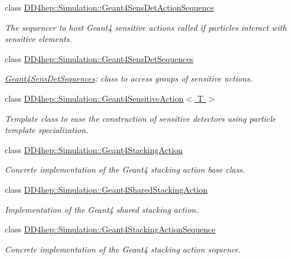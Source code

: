 \begin{DoxyCompactItemize}
class \hyperlink{class_d_d4hep_1_1_simulation_1_1_geant4_sens_det_action_sequence}{DD4hep::Simulation::Geant4SensDetActionSequence}
\begin{DoxyCompactList}\small\item\em The sequencer to host Geant4 sensitive actions called if particles interact with sensitive elements. \item\end{DoxyCompactList}\item 
class \hyperlink{class_d_d4hep_1_1_simulation_1_1_geant4_sens_det_sequences}{DD4hep::Simulation::Geant4SensDetSequences}
\begin{DoxyCompactList}\small\item\em \hyperlink{class_d_d4hep_1_1_simulation_1_1_geant4_sens_det_sequences}{Geant4SensDetSequences}: class to access groups of sensitive actions. \item\end{DoxyCompactList}\item 
class \hyperlink{class_d_d4hep_1_1_simulation_1_1_geant4_sensitive_action}{DD4hep::Simulation::Geant4SensitiveAction$<$ T $>$}
\begin{DoxyCompactList}\small\item\em Template class to ease the construction of sensitive detectors using particle template specialization. \item\end{DoxyCompactList}\item 
class \hyperlink{class_d_d4hep_1_1_simulation_1_1_geant4_stacking_action}{DD4hep::Simulation::Geant4StackingAction}
\begin{DoxyCompactList}\small\item\em Concrete implementation of the Geant4 stacking action base class. \item\end{DoxyCompactList}\item 
class \hyperlink{class_d_d4hep_1_1_simulation_1_1_geant4_shared_stacking_action}{DD4hep::Simulation::Geant4SharedStackingAction}
\begin{DoxyCompactList}\small\item\em Implementation of the Geant4 shared stacking action. \item\end{DoxyCompactList}\item 
class \hyperlink{class_d_d4hep_1_1_simulation_1_1_geant4_stacking_action_sequence}{DD4hep::Simulation::Geant4StackingActionSequence}
\begin{DoxyCompactList}\small\item\em Concrete implementation of the Geant4 stacking action sequence. \item\end{DoxyCompactList}\item 

\end{DoxyCompactItemize}
